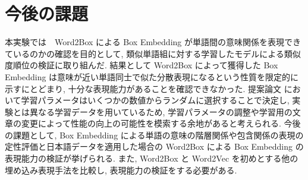 \documentclass[twocolumn]{jarticle}     %
\begin{document}
\section{今後の課題}
本実験では　Word2Box による Box Embedding が単語間の意味関係を表現できているのかの確認を目的として, 類似単語組に対する学習したモデルによる類似度順位の検証に取り組んだ. 
結果として Word2Box によって獲得した Box Embedding は意味が近い単語同士で似た分散表現になるという性質を限定的に示すにとどまり, 十分な表現能力があることを確認できなかった. 
提案論文 \cite{dasgupta-etal-2022-word2box} において学習パラメータはいくつかの数値からランダムに選択することで決定し, 実験とは異なる学習データを用いているため, 学習パラメータの調整や学習用の文章の変更によって性能の向上の可能性を模索する余地があると考えられる. 
今後の課題として, Box Embedding による単語の意味の階層関係や包含関係の表現の定性評価と日本語データを適用した場合の Word2Box による Box Embedding の表現能力の検証が挙げられる. 
また, Word2Box と Word2Vec を初めとする他の埋め込み表現手法を比較し, 表現能力の検証をする必要がある. 

\end{document}
